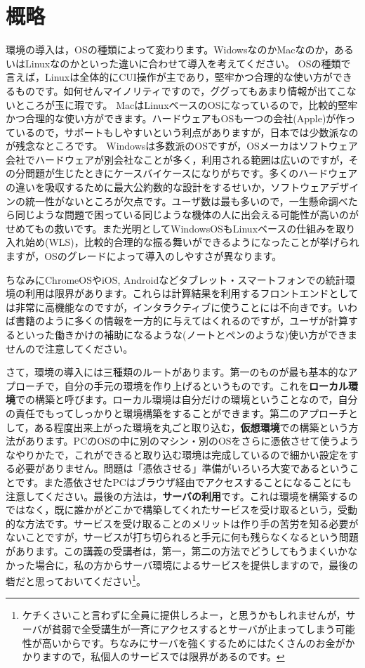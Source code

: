 \documentclass{ltjsbook}
\begin{document}
\section{概略}
環境の導入は，OSの種類によって変わります。WidowsなのかMacなのか，あるいはLinuxなのかといった違いに合わせて導入を考えてください。
OSの種類で言えば，Linuxは全体的にCUI操作が主であり，堅牢かつ合理的な使い方ができるものです。如何せんマイノリティですので，ググってもあまり情報が出てこないところが玉に瑕です。
MacはLinuxベースのOSになっているので，比較的堅牢かつ合理的な使い方ができます。ハードウェアもOSも一つの会社(Apple)が作っているので，サポートもしやすいという利点がありますが，日本では少数派なのが残念なところです。
Windowsは多数派のOSですが，OSメーカはソフトウェア会社でハードウェアが別会社なことが多く，利用される範囲は広いのですが，その分問題が生じたときにケースバイケースになりがちです。多くのハードウェアの違いを吸収するために最大公約数的な設計をするせいか，ソフトウェアデザインの統一性がないところが欠点です。ユーザ数は最も多いので，一生懸命調べたら同じような問題で困っている同じような機体の人に出会える可能性が高いのがせめてもの救いです。また光明としてWindowsOSもLinuxベースの仕組みを取り入れ始め(WLS)，比較的合理的な振る舞いができるようになったことが挙げられますが，OSのグレードによって導入のしやすさが異なります。

ちなみにChromeOSやiOS, Androidなどタブレット・スマートフォンでの統計環境の利用は限界があります。これらは計算結果を利用するフロントエンドとしては非常に高機能なのですが，インタラクティブに使うことには不向きです。いわば書籍のように多くの情報を一方的に与えてはくれるのですが，ユーザが計算するといった働きかけの補助になるような(ノートとペンのような)使い方ができませんので注意してください。

さて，環境の導入には三種類のルートがあります。第一のものが最も基本的なアプローチで，自分の手元の環境を作り上げるというものです。これを\textbf{ローカル環境}での構築と呼びます。ローカル環境は自分だけの環境ということなので，自分の責任でもってしっかりと環境構築をすることができます。第二のアプローチとして，ある程度出来上がった環境を丸ごと取り込む，\textbf{仮想環境}での構築という方法があります。PCのOSの中に別のマシン・別のOSをさらに憑依させて使うようなやりかたで，これができると取り込む環境は完成しているので細かい設定をする必要がありません。問題は「憑依させる」準備がいろいろ大変であるということです。また憑依させたPCはブラウザ経由でアクセスすることになることにも注意してください。最後の方法は，\textbf{サーバの利用}です。これは環境を構築するのではなく，既に誰かがどこかで構築してくれたサービスを受け取るという，受動的な方法です。サービスを受け取ることのメリットは作り手の苦労を知る必要がないことですが，サービスが打ち切られると手元に何も残らなくなるという問題があります。この講義の受講者は，第一，第二の方法でどうしてもうまくいかなかった場合に，私の方からサーバ環境によるサービスを提供しますので，最後の砦だと思っておいてください\footnote{ケチくさいこと言わずに全員に提供しろよー，と思うかもしれませんが，サーバが貧弱で全受講生が一斉にアクセスするとサーバが止まってしまう可能性が高いからです。ちなみにサーバを強くするためにはたくさんのお金がかかりますので，私個人のサービスでは限界があるのです。}。
\end{document}
